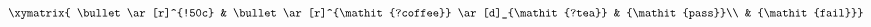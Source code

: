 $\xymatrix{
    \bullet \ar[r]^{!50c} & \bullet \ar[r]^{\mathit{?coffee}} \ar[d]_{\mathit{?tea}} & {\mathit{pass}}\\
    & {\mathit{fail}}}$
